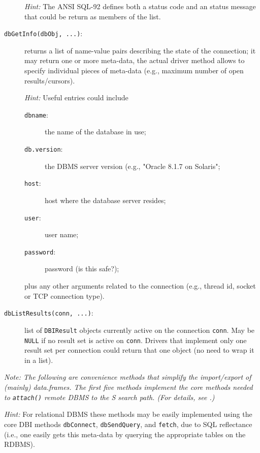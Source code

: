 \documentclass{article}
\newcommand{\sfun}[1]{\mbox{\tt #1()}}  %
\newcommand{\sobj}[1]{\mbox{\tt #1}}    %
\newcommand{\smethod}[1]{\mbox{\tt #1}} %
\begin{document}
\begin{description}
  \emph{Hint:} The ANSI SQL-92 defines both a status code and an
  status message that could be return as members of the list.

\item[\smethod{dbGetInfo(dbObj, ...)}:]
  returns a list of name-value pairs describing the state of the
  connection;  it may return one or more meta-data, the actual driver
  method allows to specify individual pieces of meta-data (e.g., 
  maximum number of open results/cursors).

  \emph{Hint:} Useful entries could include 
  \begin{description} 
  \item[\sobj{dbname}:] the name of the database in use; 
  \item[\sobj{db.version}:] the DBMS server version (e.g., 
  "Oracle 8.1.7 on Solaris"; 
  \item[\sobj{host}:] host where the database server resides; 
  \item[\sobj{user}:] user name;
  \item[\sobj{password}:] password (is this safe?);
  \end{description}
  plus any other arguments related to the connection (e.g., thread id,
  socket or TCP connection type).

\item[\smethod{dbListResults(conn, ...)}:]
  list of \sobj{DBIResult} objects currently active on the connection
  \sobj{conn}.  May be \sobj{NULL} if no result set is active
  on \sobj{conn}.  Drivers that implement only one result set per
  connection could return that one object (no need to wrap it in
  a list).

\end{description}

\emph{Note: The following are convenience methods that simplify
  the import/export of (mainly) data.frames.  The first five
  methods implement the core methods needed to \sfun{attach}
  remote DBMS to the S search path. (For details, see
  \cite{data-management:1991,database-classes:1999}.)
}

\emph{Hint:} For relational DBMS these methods may be easily implemented 
  using the core DBI methods \smethod{dbConnect}, \smethod{dbSendQuery}, 
  and \smethod{fetch}, due to SQL reflectance (i.e., one easily gets
  this meta-data by querying the appropriate tables on the RDBMS).
\end{document}
